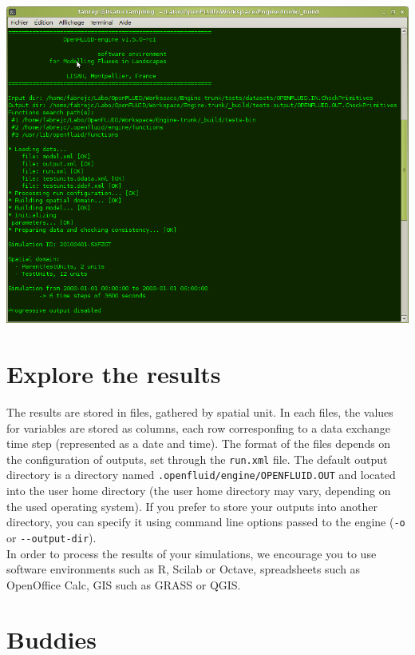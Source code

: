 \begin{htmlonly}
\begin{center}
\includegraphics[scale=0.8]{common/graphics/oferun.png}
\end{center}
\end{htmlonly}

\section{Explore the results}

The results are stored in files, gathered by spatial unit. In each files, the
values for variables are stored as columns, each row corresponfing to a data
exchange time step (represented as a date and time). The format of the files
depends on the configuration of outputs, set through the \texttt{run.xml} file.
The default output directory is a directory named
\texttt{.openfluid/engine/OPENFLUID.OUT} and located into the user home
directory (the user home directory may vary, depending on the used operating
system). If you prefer to store your outputs into another directory, you can
specify it using command line options passed to the engine (\texttt{-o} or
\verb?--?\texttt{output-dir}).\\

\noindent In order to process the results of your simulations, we encourage you
to use software environments such as R, Scilab or Octave, spreadsheets such as
OpenOffice Calc, GIS such as GRASS or QGIS.

\section{Buddies}

